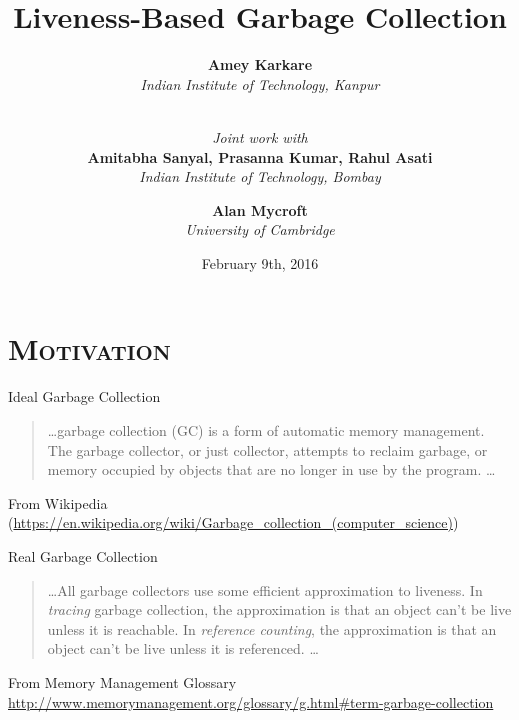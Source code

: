 \documentclass[xcolor=x11names,compress,mathserif]{beamer}
\renewcommand{\(}{\begin{columns}}
\renewcommand{\)}{\end{columns}}
\newcommand{\<}[1]{\begin{column}{#1}}
\renewcommand{\>}{\end{column}}
\begin{document}
\section{\scshape Motivation}
\begin{frame}
\title{Liveness-Based Garbage Collection}
\author{
        {\bf Amey Karkare}\\{\it Indian Institute of Technology, Kanpur}\\ \and
        \\ {\em Joint work with} \\
        {\bf Amitabha Sanyal, Prasanna Kumar, Rahul Asati}\\{\it Indian Institute of
          Technology, Bombay}\\ \and
        {\bf Alan Mycroft}\\{\it University of Cambridge}
}


\date{
	February 9th, 2016
}
\titlepage
\end{frame}


\begin{frame}{Ideal Garbage Collection}
  \begin{quote}
    \ldots garbage collection (GC) is a form of automatic memory management.  The  garbage  collector,  or  just collector,  attempts  to  reclaim
  garbage, or memory occupied by objects  that are no longer in use by
  the program. \ldots
  \end{quote}
  From Wikipedia\\ {\scriptsize (\url{https://en.wikipedia.org/wiki/Garbage_collection_(computer_science)})}
\end{frame}

\begin{frame}{Real Garbage Collection}
  \begin{quote}
    \ldots All garbage collectors use some efficient approximation to
    liveness. In {\em tracing} garbage collection, the approximation is that
    an object can't be live unless it is reachable. In {\em reference
      counting}, the approximation is that an object can't be live unless
    it is referenced. 
    \ldots
  \end{quote}
  From Memory Management Glossary\\
  {\scriptsize \url{http://www.memorymanagement.org/glossary/g.html\#term-garbage-collection}}
\end{frame}
\end{document}
